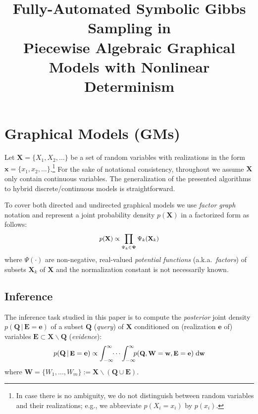 \documentclass[]{article}
\title{Fully-Automated Symbolic Gibbs Sampling in\\ Piecewise Algebraic Graphical Models with Nonlinear Determinism}
\author{} %
\renewcommand{\vec}[1]{\mathbf{#1}}
\newcommand{\bvec}[1]{\textbf{#1}}
\newcommand{\pr}{p}
\newcommand{\dd}{\;\mathrm{d}} %
\begin{document}
\maketitle


\section{Graphical Models (GMs)}
\label{sect:background}
Let $\vec{X} = \{X_1, X_2, \ldots\}$ be a set of random variables with realizations in the form 
$\vec{x} = \{x_1, x_2, \ldots\}$.\footnote{
In case there is no ambiguity, we do not distinguish between random variables and their realizations; e.g., we abbreviate $\pr(X_i = x_i)$ by $\pr(x_i)$.}
For the sake of notational consistency, 
throughout we assume $\vec{X}$ only contain continuous variables. 
The generalization of the presented algorithms to hybrid discrete/continuous models is straightforward.

To cover both directed and undirected graphical models we use
\emph{factor graph} notation \citep{kschischang2001factor}
and represent a joint probability density $\pr(\vec{X})$ in a factorized form as follows: 
\begin{equation} \footnotesize
\label{e:factor-graph}
\pr(\vec{X}) \propto \prod_{\Psi_k \in \boldsymbol\Psi} \Psi_k (\vec{X}_k)
\end{equation}
where 
$\Psi(\cdot)$ are non-negative, real-valued \emph{potential functions} 
(a.k.a.\ \emph{factors}) of subsets $\bvec{X}_k$ of $\bvec{X}$ 
 and the normalization constant is not necessarily known.

\subsection{Inference}
The inference task studied in this paper is to compute the \emph{posterior} joint density 
$\pr(\bvec{Q} \,|\, \bvec{E}=\bvec{e})$
of 
a subset $\bvec{Q}$ (\emph{query}) of $\bvec{X}$ 
conditioned on (realization $\bvec{e}$ of) 
variables  
$\bvec{E} \subset\bvec{X} \backslash \bvec{Q}$ (\emph{evidence}):
\begin{equation}\vspace{-0.5mm}\footnotesize
\label{e:inference}
\pr(\vec{Q} \,|\, \bvec{E} =\vec{e}) \propto 
\int_{-\infty}^{\infty} \!\! \cdots \int_{-\infty}^{\infty}
\!\!\! \pr(\bvec{Q}, \bvec{W} = \bvec{w}, \bvec{E}=\bvec{e} )
 \dd \bvec{w}
\end{equation}
where $\bvec{W} = \{W_1, \ldots, W_m\} := \vec{X} \backslash (\vec{Q} \cup \vec{E})$. %
\end{document}
